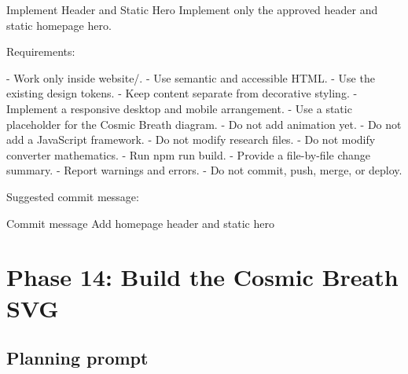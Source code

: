 \documentclass[11pt,letterpaper]{article}
\begin{document}
\begin{promptbox}{Implement Header and Static Hero}
Implement only the approved header and static homepage hero.

Requirements:

- Work only inside website/.
- Use semantic and accessible HTML.
- Use the existing design tokens.
- Keep content separate from decorative styling.
- Implement a responsive desktop and mobile arrangement.
- Use a static placeholder for the Cosmic Breath diagram.
- Do not add animation yet.
- Do not add a JavaScript framework.
- Do not modify research files.
- Do not modify converter mathematics.
- Run npm run build.
- Provide a file-by-file change summary.
- Report warnings and errors.
- Do not commit, push, merge, or deploy.
\end{promptbox}

Suggested commit message:

\begin{codebox}{Commit message}
Add homepage header and static hero
\end{codebox}

\section{Phase 14: Build the Cosmic Breath SVG}

\subsection{Planning prompt}
\end{document}
